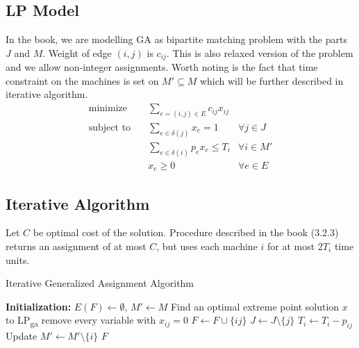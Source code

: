 \subsection{LP Model}
In the book, we are modelling GA as bipartite matching problem with the parts $J$ and $M$.
Weight of edge $(i,j)$ is $c_{ij}$. This is also relaxed version of the problem and we allow non-integer assignments. 
Worth noting is the fact that time constraint on the machines is set on $M' \subseteq M$ which will be further described in iterative algorithm. 
\begin{equation*}
    \begin{aligned}
        \textrm{minimize} \quad &  \sum_{e=(i,j) \in E} c_{ij} x_{ij} &\\
        \textrm{subject to} \quad &  \sum_{e \in \delta(j)} x_e = 1 & \forall j \in J\\
        & \sum_{e \in \delta(i)} p_e x_e \leqslant T_i & \forall i \in M'\\
        & x_e \geqslant 0 & \forall e \in E
    \end{aligned}
\end{equation*}

\subsection{Iterative Algorithm}
Let $C$ be optimal cost of the solution. Procedure described in the book (3.2.3) returns an assignment of at most $C$, but uses each machine $i$ for at most $2T_i$ time units.
\begin{algorithm}
    \caption{Iterative Generalized Assignment Algorithm}
    \begin{algorithmic}[1]
    \STATE \textbf{Initialization:} $E(F) \leftarrow \emptyset$, $M' \leftarrow M$
        \STATE Find an optimal extreme point solution $x$ to LP\textsubscript{ga}
        \STATE remove every variable with $x_{ij} = 0$
            \STATE  $F \leftarrow F \cup \{ij\}$
            \STATE  $J \leftarrow J \setminus \{j\}$
            \STATE  $T_i \leftarrow T_i - p_{ij}$
        \ENDFOR
                \STATE Update $M' \leftarrow M' \setminus \{i\}$
            \ENDIF
        \ENDFOR
    \ENDWHILE
    \RETURN $F$
    \end{algorithmic}
    \end{algorithm}


